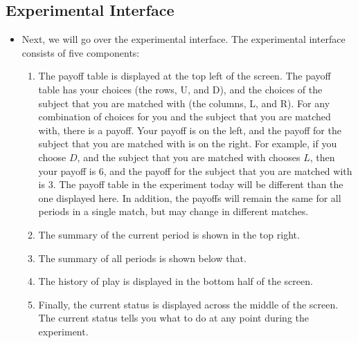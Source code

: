 \documentclass[11pt]{article}
\newcommand{\dblbkt}[1]{}
\begin{document}
\subsection*{\dblbkt{4} Experimental Interface}
\begin{itemize}
\item Next, we will go over the experimental interface.  The experimental interface consists of five components: 
\begin{enumerate} 
\item \dblbkt{3} The payoff table is displayed at the top left of the screen.  The payoff table has your choices (the rows, \dblbkt{1} U, and \dblbkt{1} D), and the choices of the subject that you are matched with (the columns,\dblbkt{1} L, and \dblbkt{1} R).  For any combination of choices for you and the subject that you are matched with, there is a payoff.  Your payoff is on the left, and the payoff for the subject that you are matched with is on the right.  For example, if you \dblbkt{1} choose $D$, and the subject that you are matched with \dblbkt{1} chooses $L$, \dblbkt{1} then your payoff is 6, and \dblbkt{1} the payoff for the subject that you are matched with is 3.  The payoff table in the experiment today will be different than the one displayed here.  In addition, the payoffs will remain the same for all periods in a single match, but may change in different matches.
\item \dblbkt{3} The summary of the current period is shown in the top right. 
\item \dblbkt{1} The summary of all periods is shown below that.
\item \dblbkt{4} The history of play is displayed in the bottom half of the screen.
\item \dblbkt{4} Finally, the current status is displayed across the middle of the screen.  The current status tells you what to do at any point during the experiment.
\end{enumerate} 
\end{itemize}
\end{document}
